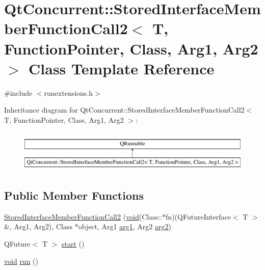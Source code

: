 \hypertarget{class_qt_concurrent_1_1_stored_interface_member_function_call2}{\section{Qt\-Concurrent\-:\-:Stored\-Interface\-Member\-Function\-Call2$<$ T, Function\-Pointer, Class, Arg1, Arg2 $>$ Class Template Reference}
\label{class_qt_concurrent_1_1_stored_interface_member_function_call2}
}


{\ttfamily \#include $<$runextensions.\-h$>$}

Inheritance diagram for Qt\-Concurrent\-:\-:Stored\-Interface\-Member\-Function\-Call2$<$ T, Function\-Pointer, Class, Arg1, Arg2 $>$\-:\begin{figure}[H]
\begin{center}
\leavevmode
\includegraphics[height=2.000000cm]{class_qt_concurrent_1_1_stored_interface_member_function_call2}
\end{center}
\end{figure}
\subsection*{Public Member Functions}
\begin{DoxyCompactItemize}
\item 
\hyperlink{class_qt_concurrent_1_1_stored_interface_member_function_call2_ae0db07ecfaf6ceb0927ed7d8431a8fb0}{Stored\-Interface\-Member\-Function\-Call2} (\hyperlink{group___u_a_v_objects_plugin_ga444cf2ff3f0ecbe028adce838d373f5c}{void}(Class\-::$\ast$fn)(Q\-Future\-Interface$<$ T $>$ \&, Arg1, Arg2), Class $\ast$object, Arg1 \hyperlink{glext_8h_a4b247ab422408c1761a36f9034c2585b}{arg1}, Arg2 \hyperlink{glext_8h_a5aee5a44bf92a9837fea48e41ef0df57}{arg2})
\item 
Q\-Future$<$ T $>$ \hyperlink{class_qt_concurrent_1_1_stored_interface_member_function_call2_aa58d14bf98831702bbae8ffef074ce24}{start} ()
\item 
\hyperlink{group___u_a_v_objects_plugin_ga444cf2ff3f0ecbe028adce838d373f5c}{void} \hyperlink{class_qt_concurrent_1_1_stored_interface_member_function_call2_a9fafd67c59b5dc245ef8ad4ade32c7d3}{run} ()
\end{DoxyCompactItemize}


